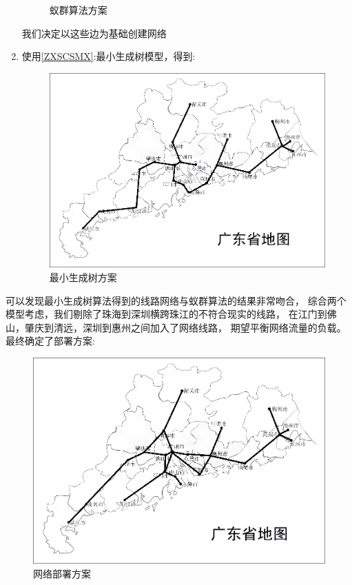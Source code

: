 \documentclass[UTF8,12pt]{ctexart}
\begin{document}
\begin{enumerate}
\begin{figure}[H]
                      \caption{蚁群算法方案}
                      \end{figure}
                我们决定以这些边为基础创建网络
                \item 使用\ref{ZXSCSMX}:最小生成树模型，得到:
                    \begin{figure}[H]
                      \centering
                      \includegraphics[scale=0.6]{ZXSCS.png}   %
                      \caption{最小生成树方案}
                      \end{figure} 
            \end{enumerate}

            可以发现最小生成树算法得到的线路网络与蚁群算法的结果非常吻合，
            综合两个模型考虑，我们剔除了珠海到深圳横跨珠江的不符合现实的线路，
            在江门到佛山，肇庆到清远，深圳到惠州之间加入了网络线路，
            期望平衡网络流量的负载。最终确定了部署方案:
            \begin{figure}[H]
                \centering
                \includegraphics[scale=0.7]{over.png}   %
                \caption{网络部署方案}
                \end{figure}
\end{document}
